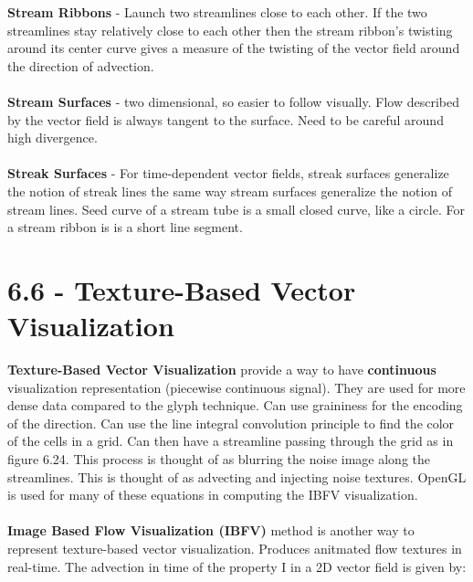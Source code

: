 \documentclass{article}
\begin{document}
\textbf{Stream Ribbons} - Launch two streamlines close to each other. If the two streamlines stay relatively close to each other then the stream ribbon's twisting around its center curve gives a measure of the twisting of the vector field around the direction of advection. %
\\\\
\textbf{Stream Surfaces} - two dimensional, so easier to follow visually. Flow described by the vector field is always tangent to the surface. Need to be careful around high divergence. 
\\\\
\textbf{Streak Surfaces} - For time-dependent vector fields, streak surfaces generalize the notion of streak lines the same way stream surfaces generalize the notion of stream lines. Seed curve of a stream tube is a small closed curve, like a circle. For a stream ribbon is is a short line segment. 

\section*{6.6 - Texture-Based Vector Visualization}
\textbf{ Texture-Based Vector Visualization} provide a way to have \textbf{continuous} visualization representation (piecewise continuous signal). They are used for more dense data compared to the glyph technique. Can use graininess for the encoding of the direction. Can use the line integral convolution principle to find the color of the cells in a grid. Can then have a streamline passing through the grid as in figure 6.24. This process is thought of as blurring the noise image along the streamlines. This is thought of as advecting and injecting noise textures. OpenGL is used for many of these equations in computing the IBFV visualization.
\\\\
\textbf{Image Based Flow Visualization (IBFV)} method is another way to represent texture-based vector visualization. Produces anitmated flow textures in real-time. The advection in time of the property I in a 2D vector field is given by:
\end{document}

